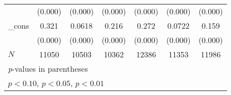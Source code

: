 {\begin{tabular}{l*{6}{c}}
            &     (0.000)         &     (0.000)         &     (0.000)         &     (0.000)         &     (0.000)         &     (0.000)         \\
[1em]
\_cons      &       0.321\sym{***}&      0.0618\sym{***}&       0.216\sym{***}&       0.272\sym{***}&      0.0722\sym{***}&       0.159\sym{***}\\
            &     (0.000)         &     (0.000)         &     (0.000)         &     (0.000)         &     (0.000)         &     (0.000)         \\
\hline
\(N\)       &       11050         &       10503         &       10362         &       12386         &       11353         &       11986         \\
\hline\hline
\multicolumn{7}{l}{\footnotesize \textit{p}-values in parentheses}\\
\multicolumn{7}{l}{\footnotesize \sym{*} \(p<0.10\), \sym{**} \(p<0.05\), \sym{***} \(p<0.01\)}\\
\end{tabular}
}
